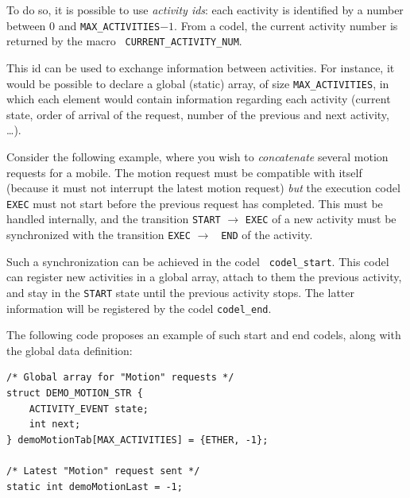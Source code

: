 To  do so, it is  possible to use {\em  activity  ids}: each eactivity is
identified by a number between  $0$ and {\tt MAX\_ACTIVITIES}$-1$. From a
codel,   the current  activity number  is    returned by the  macro  {\tt
CURRENT\_ACTIVITY\_NUM}.

This  id can be  used  to exchange   information between activities.  For
instance, it would  be possible to  declare  a global (static) array,  of
size {\tt  MAX\_ACTIVITIES},    in which   each  element   would  contain
information regarding each activity  (current state, order of  arrival of
the request, number of the previous and next activity, \ldots).

Consider  the following  example,  where  you wish  to {\em  concatenate}
several motion  requests  for a   mobile.  The  motion  request  must  be
compatible with  itself (because it must not  interrupt the latest motion
request)  {\em but} the execution codel  {\tt EXEC} must not start before
the previous request has completed.  This must be handled internally, and
the  transition {\tt START}  $\rightarrow$  {\tt EXEC}  of a new activity
must be  synchronized with the  transition {\tt  EXEC} $\rightarrow$ {\tt
END} of the activity.

Such  a  synchronization     can  be  achieved   in     the   codel  {\tt
codel\_start}. This codel can register new activities in a global
array, attach to them the previous activity, and  stay in the {\tt START}
state  until the previous activity  stops. The latter information will be
registered by the codel {\tt codel\_end}.

The following  code  proposes an  example of such   start and end codels,
along with the global data definition:


\begin{center}\begin{cartouche}\small\begin{verbatim}
/* Global array for "Motion" requests */
struct DEMO_MOTION_STR {
    ACTIVITY_EVENT state;
    int next;
} demoMotionTab[MAX_ACTIVITIES] = {ETHER, -1};

/* Latest "Motion" request sent */
static int demoMotionLast = -1; 
\end{verbatim}\end{cartouche}\end{center}

